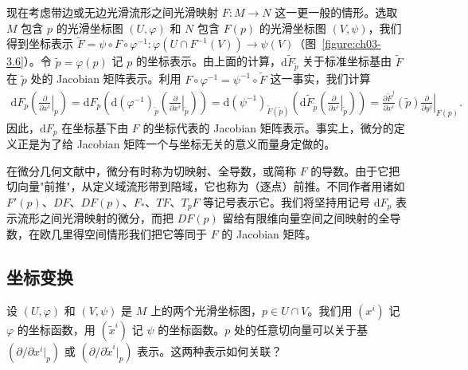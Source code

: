 \documentclass[../../main.tex]{subfiles}
\begin{document}
现在考虑带边或无边光滑流形之间光滑映射 $F:M\to N$ 这一更一般的情形。选取 $M$ 包含 $p$ 的光滑坐标图 $(U,\varphi)$ 和 $N$ 包含 $F(p)$ 的光滑坐标图 $(V,\psi)$，我们得到坐标表示 $\widetilde{F}=\psi\circ F\circ\varphi^{-1}:\varphi(U\cap F^{-1}(V))\to\psi(V)$（图~\cref{figure:ch03-3.6}）。令 $\widetilde{p}=\varphi(p)$ 记 $p$ 的坐标表示。由上面的计算，$\mathrm{d}\widetilde{F}_{\widetilde{p}}$ 关于标准坐标基由 $\widetilde{F}$ 在 $\widetilde{p}$ 处的 Jacobian 矩阵表示。利用 $F\circ\varphi^{-1}=\psi^{-1}\circ\widetilde{F}$ 这一事实，我们计算
\begin{align}\label{align:ch03-流形微分基}
\mathrm{d}F_{p}\left(\left.\frac{\partial}{\partial x^{i}}\right|_{p}\right)
=\mathrm{d}F_{p}\left(\mathrm{d}(\varphi^{-1})_{\widetilde{p}}\left(\left.\frac{\partial}{\partial x^{i}}\right|_{\widetilde{p}}\right)\right)
=\mathrm{d}(\psi^{-1})_{\widetilde{F}(\widetilde{p})}\left(\mathrm{d}\widetilde{F}_{\widetilde{p}}\left(\left.\frac{\partial}{\partial x^{i}}\right|_{\widetilde{p}}\right)\right)
=\frac{\partial\widetilde{F}^{j}}{\partial x^{i}}(\widetilde{p})\left.\frac{\partial}{\partial y^{j}}\right|_{F(p)}.
\end{align}
因此，$\mathrm{d}F_{p}$ 在坐标基下由 $F$ 的坐标代表的 Jacobian 矩阵表示。事实上，微分的定义正是为了给 Jacobian 矩阵一个与坐标无关的意义而量身定做的。

在微分几何文献中，微分有时称为切映射、全导数，或简称 $F$ 的导数。由于它把切向量"前推"，从定义域流形带到陪域，它也称为（逐点）前推。不同作者用诸如 $F'(p)$、$DF$、$DF(p)$、$F_{*}$、$TF$、$T_{p}F$ 等记号表示它。我们将坚持用记号 $\mathrm{d}F_{p}$ 表示流形之间光滑映射的微分，而把 $DF(p)$ 留给有限维向量空间之间映射的全导数，在欧几里得空间情形我们把它等同于 $F$ 的 Jacobian 矩阵。

\subsection{坐标变换}\label{subsection:ch03-坐标变换}

设 $(U,\varphi)$ 和 $(V,\psi)$ 是 $M$ 上的两个光滑坐标图，$p\in U\cap V$。我们用 $(x^{i})$ 记 $\varphi$ 的坐标函数，用 $(\widetilde{x}^{i})$ 记 $\psi$ 的坐标函数。$p$ 处的任意切向量可以关于基 $(\partial/\partial x^{i}|_{p})$ 或 $(\partial/\partial\widetilde{x}^{i}|_{p})$ 表示。这两种表示如何关联？
\end{document}
